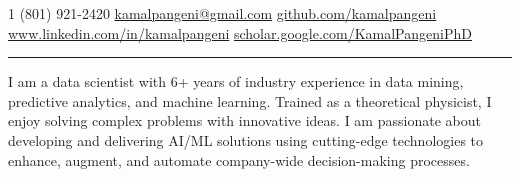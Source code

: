 \documentclass[10pt,letterpaper]{article}
\begin{document}

\noindent\textsmaller{+}1 (801) 921-2420\bull
\href{mailto:kamalpangeni@gmail.com}{kamalpangeni@gmail.com}\bull
\href{https://github.com/kamalpangeni}
{github.com/kamalpangeni}\\
\href{https://www.linkedin.com/in/kamal-pangeni-31242a29/}
{www.linkedin.com/in/kamalpangeni}\bull
\href{https://scholar.google.com/citations?user=MJPS73gAAAAJ&hl=en}
{scholar.google.com/\textsmaller{+}KamalPangeniPhD}


\hrule
\vspace{1ex}
I am a data scientist with 6+ years of industry experience in data mining, predictive analytics, and machine learning. Trained as a theoretical physicist, I enjoy solving complex problems with innovative ideas. I am passionate about developing and delivering AI/ML solutions using cutting-edge technologies to enhance, augment, and automate company-wide decision-making processes.
\vspace{-2ex}
 
\end{document}

